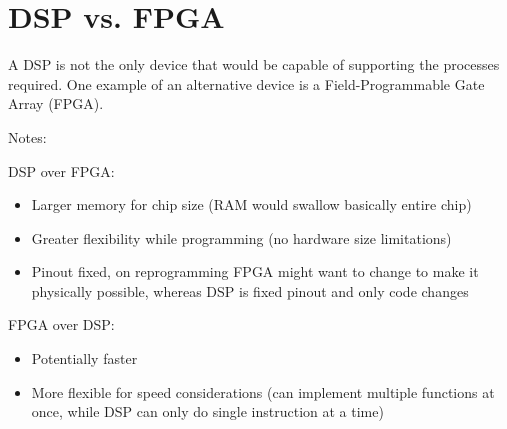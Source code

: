 \newpage
\section{DSP vs. FPGA}
A DSP is not the only device that would be capable of supporting the processes required. One example of an alternative device is a Field-Programmable Gate Array (FPGA).

Notes:

DSP over FPGA:
\begin{itemize}
\item Larger memory for chip size (RAM would swallow basically entire chip)
\item Greater flexibility while programming (no hardware size limitations)
\item Pinout fixed, on reprogramming FPGA might want to change to make it physically possible, whereas DSP is fixed pinout and only code changes
\end{itemize}

FPGA over DSP:
\begin{itemize}
\item Potentially faster
\item More flexible for speed considerations (can implement multiple functions at once, while DSP can only do single instruction at a time)
\end{itemize}
